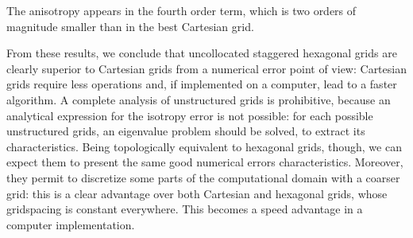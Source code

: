 The anisotropy appears in the fourth order term, which is two orders
of magnitude smaller than in the best Cartesian grid.

From these results, we conclude that uncollocated staggered hexagonal
grids are clearly superior to Cartesian grids from a numerical error
point of view: Cartesian grids require less operations and, if
implemented on a computer, lead to a faster algorithm. A complete
analysis of unstructured grids is prohibitive, because an
analytical expression for the isotropy error is not possible: for each
possible unstructured grids, an eigenvalue problem should be solved,
to extract its characteristics. Being topologically equivalent to
hexagonal grids, though, we can expect them to present the same good
numerical errors characteristics. Moreover, they permit to discretize
some parts of the computational domain with a coarser grid: this is a
clear advantage over both Cartesian and hexagonal grids, whose
gridspacing is constant everywhere. This becomes a speed advantage in
a computer implementation.















